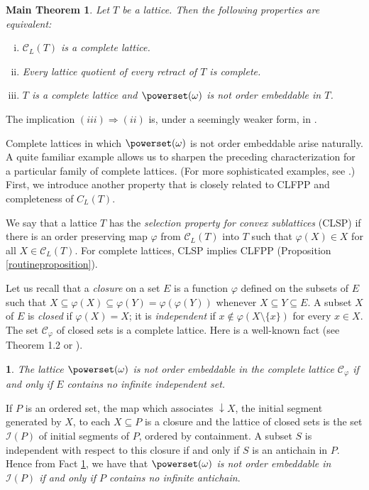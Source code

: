 \documentclass[12pt]{amsart}
\newtheorem{maintheorem}{{\bf Main Theorem}}
\newtheorem{fact}[definition]{\noindent {\bf Fact}}
\begin{document}
\begin{maintheorem} \label{thm:main} 
Let $T$ be a lattice. Then the following properties are equivalent:
\begin{enumerate} [(i)]
\item $\mathcal{C}_{ L}(T)$ is a complete lattice.
\item Every lattice quotient of every retract of $T$ is complete.
\item $T$ is a complete lattice and $\powerset (\omega)$ is not order embeddable in $T$. 
\end{enumerate}
\end{maintheorem}

The implication $(iii)\Rightarrow (ii)$ is, under a seemingly weaker form, in \cite{P-R}.

Complete lattices in which $\powerset (\omega)$ is not order
embeddable arise naturally.  A quite familiar example allows us to
sharpen the preceding characterization for a particular family of
complete lattices. (For more sophisticated examples, see \cite
{L-M-P1, L-M-P2}.)  First, we introduce another property that is
closely related to CLFPP and completeness of $C_L (T)$.

We say that a lattice $T$ has the \emph{selection property for convex
sublattices} (CLSP) if there is an order preserving map $\varphi$ from
$\mathcal{C}_{ L}(T)$ into $T$ such that $\varphi(X)\in X$ for all
$X\in \mathcal{C}_{L}(T)$. For complete lattices, CLSP implies 
CLFPP (Proposition \ref{routineproposition}).

Let us recall that a \emph{closure} on a set $E$ is a function
$\varphi$ defined on the subsets of $E$ such that $X\subseteq
\varphi(X)\subseteq \varphi(Y)= \varphi(\varphi(Y))$ whenever
$X\subseteq Y\subseteq E$. A subset $X$ of $E$ is \emph{closed} if
$\varphi(X)=X$; it is \emph{independent} if $x\not \in \varphi
(X\setminus \{x\})$ for every $x\in X$. The set $\mathcal C_{\varphi}$
of closed sets is a complete lattice.  Here is a well-known fact (see
\cite{chakir-pouzet} Theorem 1.2 or \cite {L-M-P1}).

\begin{fact}\label{fact:closure} 
The lattice $\powerset (\omega)$ is not order embeddable in the
complete lattice $\mathcal C_{\varphi}$ if and only if $E$ contains no
infinite independent set.
\end{fact}
 
If $P$ is an ordered set, the map which associates ${\downarrow \!\!} 
X$, the initial segment generated by $X$, to each $X \subseteq P$ is a
closure and the lattice of closed sets is the set $\mathcal {I}(P)$ of
initial segments of $P$, ordered by containment.  A subset $S$ is
independent with respect to this closure if and only if $S$ is an
antichain in $P$.  Hence from Fact \ref{fact:closure}, we have that
\emph{$\powerset (\omega)$ is not order embeddable in $\mathcal {I}(P)$ 
if and only if $P$ contains no infinite antichain}.
\end{document}

